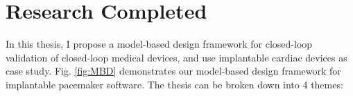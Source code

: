 \documentclass[a4paper]{article}
\begin{document}
\section{Research Completed}
In this thesis, I propose a model-based design framework for closed-loop validation of closed-loop medical devices, and use implantable cardiac devices as case study.
Fig. \ref{fig:MBD} demonstrates our model-based design framework for implantable pacemaker software.
The thesis can be broken down into 4 themes:
%
\end{document}
